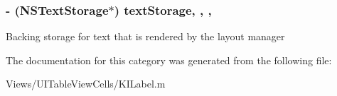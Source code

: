 \subsubsection[{text\+Storage}]{\setlength{\rightskip}{0pt plus 5cm}-\/ (N\+S\+Text\+Storage$\ast$) text\+Storage\hspace{0.3cm}{\ttfamily [read]}, {\ttfamily [write]}, {\ttfamily [nonatomic]}, {\ttfamily [retain]}}\label{category_k_i_label_07_08_aaf49e47faa508062539d05e77394e64b}
Backing storage for text that is rendered by the layout manager 

The documentation for this category was generated from the following file\+:\begin{DoxyCompactItemize}
\item 
Views/\+U\+I\+Table\+View\+Cells/K\+I\+Label.\+m\end{DoxyCompactItemize}
